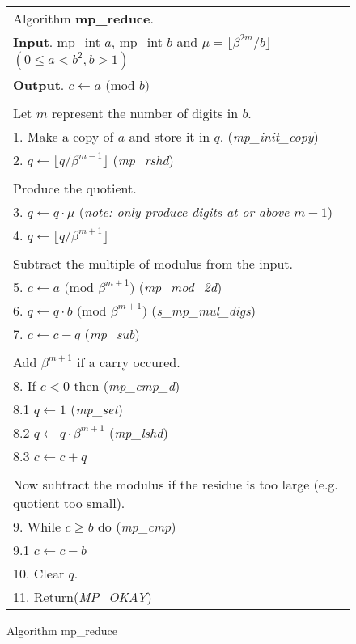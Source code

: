 \documentclass[b5paper]{book}
\begin{document}
\newpage\begin{figure}[!here]
\begin{small}
\begin{center}
\begin{tabular}{l}
\hline Algorithm \textbf{mp\_reduce}. \\
\textbf{Input}.   mp\_int $a$, mp\_int $b$ and $\mu = \lfloor \beta^{2m}/b \rfloor$ $(0 \le a < b^2, b > 1)$ \\
\textbf{Output}.  $c \leftarrow a \mbox{ (mod }b\mbox{)}$ \\
\hline \\
Let $m$ represent the number of digits in $b$.  \\
1.  Make a copy of $a$ and store it in $q$.  (\textit{mp\_init\_copy}) \\
2.  $q \leftarrow \lfloor q / \beta^{m - 1} \rfloor$ (\textit{mp\_rshd}) \\
\\
Produce the quotient. \\
3.  $q \leftarrow q \cdot \mu$  (\textit{note: only produce digits at or above $m-1$}) \\
4.  $q \leftarrow \lfloor q / \beta^{m + 1} \rfloor$ \\
\\
Subtract the multiple of modulus from the input. \\
5.  $c \leftarrow a \mbox{ (mod }\beta^{m+1}\mbox{)}$ (\textit{mp\_mod\_2d}) \\
6.  $q \leftarrow q \cdot b \mbox{ (mod }\beta^{m+1}\mbox{)}$ (\textit{s\_mp\_mul\_digs}) \\
7.  $c \leftarrow c - q$ (\textit{mp\_sub}) \\
\\
Add $\beta^{m+1}$ if a carry occured. \\
8.  If $c < 0$ then (\textit{mp\_cmp\_d}) \\
\hspace{3mm}8.1  $q \leftarrow 1$ (\textit{mp\_set}) \\
\hspace{3mm}8.2  $q \leftarrow q \cdot \beta^{m+1}$ (\textit{mp\_lshd}) \\
\hspace{3mm}8.3  $c \leftarrow c + q$ \\
\\
Now subtract the modulus if the residue is too large (e.g. quotient too small). \\
9.  While $c \ge b$ do (\textit{mp\_cmp}) \\
\hspace{3mm}9.1  $c \leftarrow c - b$ \\
10.  Clear $q$. \\
11.  Return(\textit{MP\_OKAY}) \\
\hline
\end{tabular}
\end{center}
\end{small}
\caption{Algorithm mp\_reduce}
\end{figure}
\end{document}
